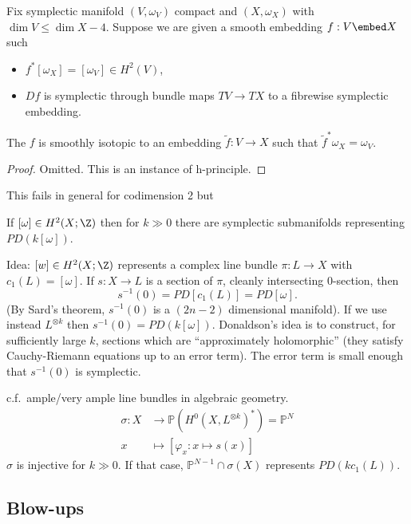 \documentclass[a4paper]{article}
\renewcommand*{\P}{\mathbb{P}}
\begin{document}
\begin{theorem}[Gromov]
  Fix symplectic manifold \((V, \omega_V)\) compact and \((X, \omega_X)\) with \(\dim V \leq \dim X - 4\). Suppose we are given a smooth embedding \(f: V \embed X\) such
  \begin{itemize}
  \item \(f^*[\omega_X] = [\omega_V] \in H^2(V)\),
  \item \(Df\) is symplectic through bundle maps \(TV \to TX\) to a fibrewise symplectic embedding.
  \end{itemize}
  The \(f\) is smoothly isotopic to an embedding \(\tilde f: V \to X\) such that \(\tilde f^*\omega_X = \omega_V\).
\end{theorem}

\begin{proof}
  Omitted. This is an instance of h-principle.
\end{proof}

This fails in general for codimension 2 but

\begin{theorem}[Donaldson]
  If \([\omega] \in H^2(X; \Z)\) then for \(k \gg 0\) there are symplectic submanifolds representing \(PD (k [\omega])\).
\end{theorem}

Idea: \([w] \in H^2(X; \Z)\) represents a complex line bundle \(\pi: L \to X\) with \(c_1(L) = [\omega]\). If \(s: X \to L\) is a section of \(\pi\), cleanly intersecting \(0\)-section, then
\[
  s^{-1}(0) = PD [c_1(L)] = PD[\omega].
\]
(By Sard's theorem, \(s^{-1}(0)\) is a \((2n - 2)\) dimensional manifold). If we use instead \(L^{\otimes k}\) then \(s^{-1}(0) = PD (k[\omega])\). Donaldson's idea is to construct, for sufficiently large \(k\), sections which are ``approximately holomorphic'' (they satisfy Cauchy-Riemann equations up to an error term). The error term is small enough that \(s^{-1}(0)\) is symplectic.

c.f.\ ample/very ample line bundles in algebraic geometry.
\begin{align*}
  \sigma: X &\to \P(H^0(X, L^{\otimes k})^*) = \P^N \\
  x &\mapsto [\varphi_x: x \mapsto s(x)]
\end{align*}
\(\sigma\) is injective for \(k \gg 0\). If that case, \(\P^{N - 1} \cap \sigma(X)\) represents \(PD(k c_1(L))\).

\subsection{Blow-ups}
\end{document}
